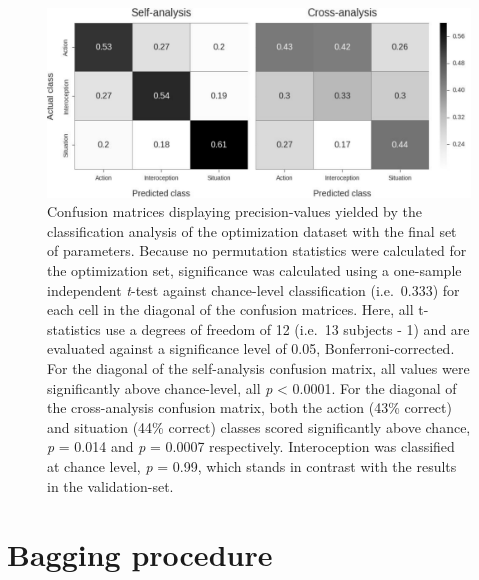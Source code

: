 \documentclass[12pt,american,a4paper,oneside,]{memoir} %
\begin{document}
\begin{figure}
\centering
\includegraphics{_bookdown_files/shared-states-files/figures/figure_S3.pdf}
\caption{\label{fig:fig-shared-states-S3}Confusion matrices displaying precision-values yielded by the classification analysis of the optimization dataset with the final set of parameters. Because no permutation statistics were calculated for the optimization set, significance was calculated using a one-sample independent \emph{t}-test against chance-level classification (i.e.~0.333) for each cell in the diagonal of the confusion matrices. Here, all t-statistics use a degrees of freedom of 12 (i.e.~13 subjects - 1) and are evaluated against a significance level of 0.05, Bonferroni-corrected. For the diagonal of the self-analysis confusion matrix, all values were significantly above chance-level, all \emph{p} \textless{} 0.0001. For the diagonal of the cross-analysis confusion matrix, both the action (43\% correct) and situation (44\% correct) classes scored significantly above chance, \emph{p} = 0.014 and \emph{p} = 0.0007 respectively. Interoception was classified at chance level, \emph{p} = 0.99, which stands in contrast with the results in the validation-set.}
\end{figure}



\newpage
\pagestyle{empty}

\hypertarget{bagging-procedure}{%
\section{Bagging procedure}\label{bagging-procedure}}

\end{document}
